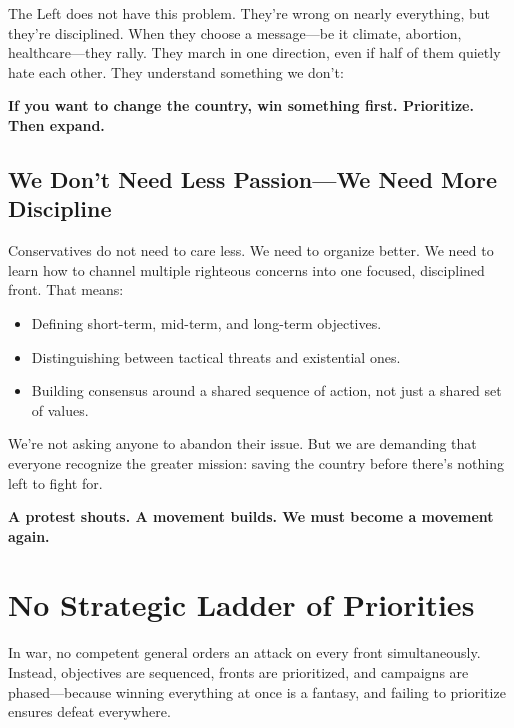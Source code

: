 The Left does not have this problem. They’re wrong on nearly everything, but they’re disciplined. When they choose a message—be it climate, abortion, healthcare—they rally. They march in one direction, even if half of them quietly hate each other. They understand something we don’t:

\textbf{If you want to change the country, win something first. Prioritize. Then expand.}

\subsection*{We Don’t Need Less Passion—We Need More Discipline}

Conservatives do not need to care less. We need to organize better. We need to learn how to channel multiple righteous concerns into one focused, disciplined front. That means:
\begin{itemize}
    \item Defining short-term, mid-term, and long-term objectives.
    \item Distinguishing between tactical threats and existential ones.
    \item Building consensus around a shared sequence of action, not just a shared set of values.
\end{itemize}

We’re not asking anyone to abandon their issue. But we are demanding that everyone recognize the greater mission: saving the country before there’s nothing left to fight for.

\textbf{A protest shouts. A movement builds. We must become a movement again.}























\section{No Strategic Ladder of Priorities}

In war, no competent general orders an attack on every front simultaneously. Instead, objectives are sequenced, fronts are prioritized, and campaigns are phased—because winning everything at once is a fantasy, and failing to prioritize ensures defeat everywhere.

